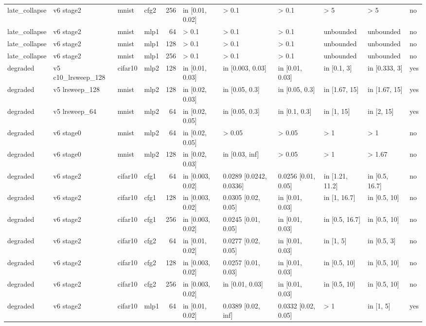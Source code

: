 \begin{table}[htbp]
{\begin{tabular}{@{}llllrllllll@{}}
late\_collapse & v6 stage2 & mnist & cfg2 & 256 & in [0.01, 0.02] & > 0.1 & > 0.1 & > 5 & > 5 & no \\
late\_collapse & v6 stage2 & mnist & mlp1 & 64 & > 0.1 & > 0.1 & > 0.1 & unbounded & unbounded & no \\
late\_collapse & v6 stage2 & mnist & mlp1 & 128 & > 0.1 & > 0.1 & > 0.1 & unbounded & unbounded & no \\
late\_collapse & v6 stage2 & mnist & mlp1 & 256 & > 0.1 & > 0.1 & > 0.1 & unbounded & unbounded & no \\
degraded & v5 c10\_lrsweep\_128 & cifar10 & mlp2 & 128 & in [0.01, 0.03] & in [0.003, 0.03] & in [0.01, 0.03] & in [0.1, 3] & in [0.333, 3] & yes \\
degraded & v5 lrsweep\_128 & mnist & mlp2 & 128 & in [0.02, 0.03] & in [0.05, 0.3] & in [0.05, 0.3] & in [1.67, 15] & in [1.67, 15] & yes \\
degraded & v5 lrsweep\_64 & mnist & mlp2 & 64 & in [0.02, 0.05] & in [0.05, 0.3] & in [0.1, 0.3] & in [1, 15] & in [2, 15] & yes \\
degraded & v6 stage0 & mnist & mlp2 & 64 & in [0.02, 0.05] & > 0.05 & > 0.05 & > 1 & > 1 & no \\
degraded & v6 stage0 & mnist & mlp2 & 128 & in [0.02, 0.03] & in [0.03, inf] & > 0.05 & > 1 & > 1.67 & no \\
degraded & v6 stage2 & cifar10 & cfg1 & 64 & in [0.003, 0.02] & 0.0289 [0.0242, 0.0336] & 0.0256 [0.01, 0.05] & in [1.21, 11.2] & in [0.5, 16.7] & no \\
degraded & v6 stage2 & cifar10 & cfg1 & 128 & in [0.003, 0.02] & 0.0305 [0.02, 0.05] & in [0.01, 0.03] & in [1, 16.7] & in [0.5, 10] & no \\
degraded & v6 stage2 & cifar10 & cfg1 & 256 & in [0.003, 0.02] & 0.0245 [0.01, 0.05] & in [0.01, 0.03] & in [0.5, 16.7] & in [0.5, 10] & no \\
degraded & v6 stage2 & cifar10 & cfg2 & 64 & in [0.01, 0.02] & 0.0277 [0.02, 0.05] & in [0.01, 0.03] & in [1, 5] & in [0.5, 3] & no \\
degraded & v6 stage2 & cifar10 & cfg2 & 128 & in [0.003, 0.02] & 0.0257 [0.01, 0.03] & in [0.01, 0.03] & in [0.5, 10] & in [0.5, 10] & no \\
degraded & v6 stage2 & cifar10 & cfg2 & 256 & in [0.003, 0.02] & in [0.01, 0.03] & in [0.01, 0.03] & in [0.5, 10] & in [0.5, 10] & no \\
degraded & v6 stage2 & cifar10 & mlp1 & 64 & in [0.01, 0.02] & 0.0389 [0.02, inf] & 0.0332 [0.02, 0.05] & > 1 & in [1, 5] & yes \\

\end{tabular}}
\end{table}

